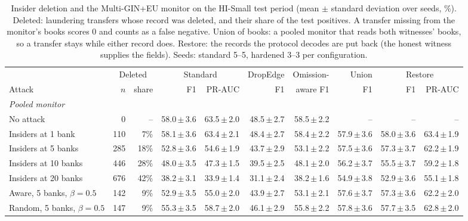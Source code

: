 \begin{table}[!htbp]\centering\scriptsize\setlength{\tabcolsep}{3pt}
\caption{Insider deletion and the Multi-GIN+EU monitor on the HI-Small test period (mean $\pm$ standard deviation over seeds, \%). Deleted: laundering transfers whose record was deleted, and their share of the test positives. A transfer missing from the monitor's books scores 0 and counts as a false negative. Union of books: a pooled monitor that reads both witnesses' books, so a transfer stays while either record does. Restore: the records the protocol decodes are put back (the honest witness supplies the fields). Seeds: standard 5--5, hardened 3--3 per configuration.}\label{tab:aml}
\begin{adjustbox}{max width=\linewidth}\begin{tabular}{lrrrrrrrrr}\toprule
 & \multicolumn{2}{c}{Deleted} & \multicolumn{2}{c}{Standard} & DropEdge & Omission- & Union & \multicolumn{2}{c}{Restore} \\\cmidrule(lr){2-3}\cmidrule(lr){4-5}\cmidrule(lr){9-10}
Attack & $n$ & share & F1 & PR-AUC & F1 & aware F1 & F1 & F1 & PR-AUC \\\midrule
\multicolumn{10}{l}{\emph{Pooled monitor}} \\
No attack & 0 & -- & 58.0\,$\pm$\,3.6 & 63.5\,$\pm$\,2.0 & 48.5\,$\pm$\,2.7 & 58.5\,$\pm$\,2.2 & -- & -- & -- \\
Insiders at 1 bank & 110 & 7\% & 58.1\,$\pm$\,3.6 & 63.4\,$\pm$\,2.1 & 48.4\,$\pm$\,2.7 & 58.4\,$\pm$\,2.2 & 57.9\,$\pm$\,3.6 & 58.0\,$\pm$\,3.6 & 63.4\,$\pm$\,1.9 \\
Insiders at 5 banks & 285 & 18\% & 52.8\,$\pm$\,3.6 & 54.6\,$\pm$\,1.9 & 43.7\,$\pm$\,2.9 & 53.1\,$\pm$\,2.2 & 57.5\,$\pm$\,3.6 & 57.3\,$\pm$\,3.7 & 62.2\,$\pm$\,1.9 \\
Insiders at 10 banks & 446 & 28\% & 48.0\,$\pm$\,3.5 & 47.3\,$\pm$\,1.5 & 39.5\,$\pm$\,2.5 & 48.1\,$\pm$\,2.0 & 56.2\,$\pm$\,3.7 & 55.5\,$\pm$\,3.7 & 59.2\,$\pm$\,1.8 \\
Insiders at 20 banks & 676 & 42\% & 38.2\,$\pm$\,3.1 & 33.9\,$\pm$\,1.4 & 31.1\,$\pm$\,2.4 & 38.2\,$\pm$\,1.6 & 54.9\,$\pm$\,3.8 & 52.9\,$\pm$\,3.6 & 55.1\,$\pm$\,1.8 \\
Aware, 5 banks, $\beta=0.5$ & 142 & 9\% & 52.9\,$\pm$\,3.5 & 55.0\,$\pm$\,2.0 & 43.9\,$\pm$\,2.7 & 53.1\,$\pm$\,2.1 & 57.6\,$\pm$\,3.7 & 57.3\,$\pm$\,3.6 & 62.2\,$\pm$\,2.0 \\
Random, 5 banks, $\beta=0.5$ & 147 & 9\% & 55.3\,$\pm$\,3.5 & 58.7\,$\pm$\,2.0 & 46.1\,$\pm$\,2.9 & 55.8\,$\pm$\,2.2 & 57.8\,$\pm$\,3.6 & 57.7\,$\pm$\,3.5 & 62.8\,$\pm$\,2.0 \\

\end{tabular}
\end{adjustbox}
\end{table}
